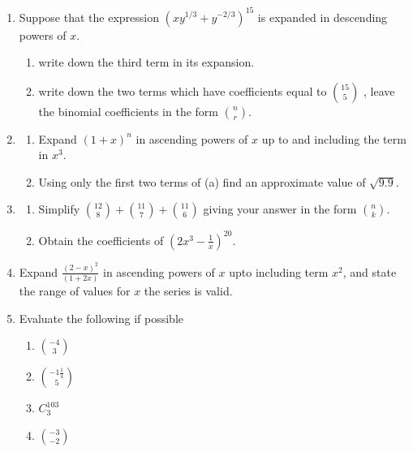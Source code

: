 \documentclass[11pt,a4paper]{article}
\theoremstyle{definition}
\begin{document}
\begin{enumerate}
\item
Suppose that the expression $(xy^{1/3}+y^{-2/3})^{15}$ is expanded in descending powers of $x$.
\begin{enumerate}
       \item write down the third term in its expansion.
       \item write down the two terms which have coefficients equal to $
\binom{15}{5}              
$ , leave the binomial coefficients in the form $
\binom{n}{r}
$.\\       
\end{enumerate}

\item
\begin{enumerate}
      \item Expand $(1+x)^n$ in ascending powers of $x$ up to and including the term in $x^3$.
      \item Using only the first two terms of (a) find an approximate value of $\sqrt{9.9}$.\\
\end{enumerate}



\item
\begin{enumerate}
      \item Simplify $
\binom{12}{8}
+
\binom{11}{7} 
+
\binom{11}{6}     
$ giving your answer in the form $
\binom{n}{k}
$.
      \item Obtain the coefficients of $\left(2x^3-\frac{1}{x}\right)^{20}$.\\
\end{enumerate}

\item
Expand $\frac{(2-x)^2}{(1+2x)}$ in ascending powers of $x$ upto including term $x^2$, and state the range of values for $x$ the series is valid.\\

\item
Evaluate the following if possible
\begin{enumerate}
      \item $
\binom{-4}{3}     
$\\
       \item $
\binom{-1\frac{1}{4}}{5}      
$\\
        \item $C^{103}_3$\\
        \item $
\binom{-3}{-2}        
$\\
\end{enumerate}


\end{enumerate}
\end{document}
